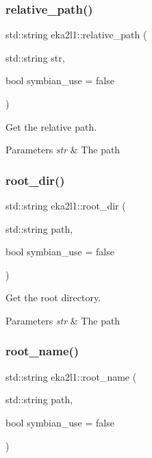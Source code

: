 \subsubsection{\texorpdfstring{relative\+\_\+path()}{relative\_path()}}
{\footnotesize\ttfamily std\+::string eka2l1\+::relative\+\_\+path (\begin{DoxyParamCaption}\item[{std\+::string}]{str,  }\item[{bool}]{symbian\+\_\+use = {\ttfamily false} }\end{DoxyParamCaption})}



Get the relative path. 


\begin{DoxyParams}{Parameters}
{\em str} & The path \\
\hline
\end{DoxyParams}
\mbox{\label{namespaceeka2l1_a5ec05e7db5c7f34d77bd67bb6bbdec78}} 
\subsubsection{\texorpdfstring{root\+\_\+dir()}{root\_dir()}}
{\footnotesize\ttfamily std\+::string eka2l1\+::root\+\_\+dir (\begin{DoxyParamCaption}\item[{std\+::string}]{path,  }\item[{bool}]{symbian\+\_\+use = {\ttfamily false} }\end{DoxyParamCaption})}



Get the root directory. 


\begin{DoxyParams}{Parameters}
{\em str} & The path \\
\hline
\end{DoxyParams}
\mbox{\label{namespaceeka2l1_aea213c386c9fc3a4922db87e29cf3183}} 
\subsubsection{\texorpdfstring{root\+\_\+name()}{root\_name()}}
{\footnotesize\ttfamily std\+::string eka2l1\+::root\+\_\+name (\begin{DoxyParamCaption}\item[{std\+::string}]{path,  }\item[{bool}]{symbian\+\_\+use = {\ttfamily false} }\end{DoxyParamCaption})}



